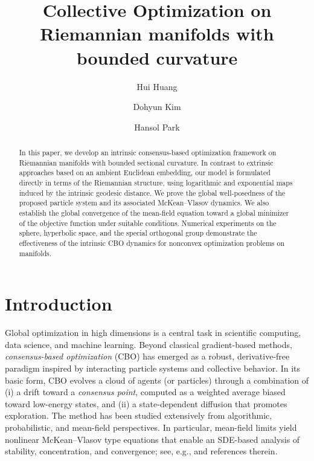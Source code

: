 \documentclass[11pt]{amsart}
\title[]{Collective Optimization on Riemannian manifolds with bounded curvature}
\author[H. Huang]{Hui Huang}
\author[D. Kim]{Dohyun Kim}
\author[H. Park]{Hansol Park}
\begin{document}


\begin{abstract}
In this paper, we develop an intrinsic consensus-based optimization framework on Riemannian manifolds with bounded sectional curvature. In contrast to extrinsic approaches based on an ambient Euclidean embedding, our model is formulated directly in terms of the Riemannian structure, using logarithmic and exponential maps induced by the intrinsic geodesic distance. We prove the global well-posedness of the proposed particle system and its associated McKean--Vlasov dynamics. We also establish the global convergence of the mean-field equation toward a global minimizer of the objective function under suitable conditions. Numerical experiments on the sphere, hyperbolic space, and the special orthogonal group demonstrate the effectiveness of the intrinsic CBO dynamics for nonconvex optimization problems on manifolds.
\end{abstract}

\maketitle 




\section{Introduction}
Global optimization in high dimensions is a central task in scientific computing, data science, and machine learning. Beyond classical gradient-based methods, \emph{consensus-based optimization} (CBO) \cite{pinnau2017consensus} has emerged as a robust, derivative-free paradigm inspired by interacting particle systems and collective behavior. In its basic form, CBO evolves a cloud of agents (or particles) through a combination of (i) a drift toward a \emph{consensus point}, computed as a weighted average biased toward low-energy states, and (ii) a state-dependent diffusion that promotes exploration. 
The method has been studied extensively from algorithmic, probabilistic, and mean-field perspectives. In particular, mean-field limits yield nonlinear McKean--Vlasov type equations that enable an SDE-based analysis of stability, concentration, and convergence; see, e.g., \cite{borghi2024kinetic, carrillo2021consensus,fornasier2026consensus,grassi2021particle,huang2025faithful} and references therein. 
\end{document}
